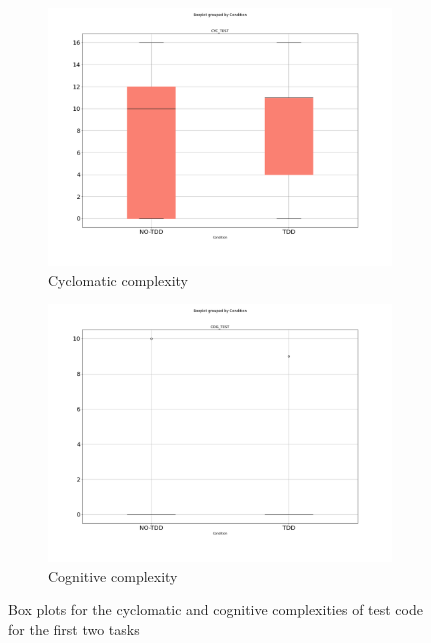\begin{figure}[htbp]
    \begin{subfigure}{\textwidth}
        \includegraphics[width=\textwidth]{figures/box_plots/CYC_TEST.png}
        \caption{Cyclomatic complexity}
    \end{subfigure}
    
    \bigskip
    
    \begin{subfigure}{\textwidth}
        \includegraphics[width=\textwidth]{figures/box_plots/COG_TEST.png}
        \caption{Cognitive complexity}
    \end{subfigure}
    
    \caption{Box plots for the cyclomatic and cognitive complexities of test code for the first two tasks}
    \label{bp_task1_2_cyc_test_cog_test}
\end{figure}

